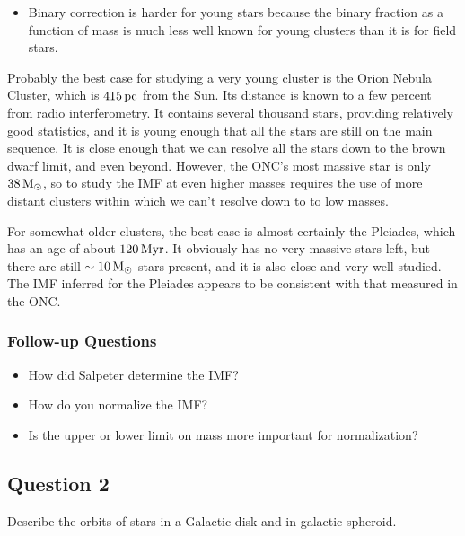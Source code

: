 \documentclass[a4paper,10pt]{article}
\begin{document}
\begin{itemize}
    \item Binary correction is harder for young stars because the binary fraction as a function of mass is much less well known for young clusters than it is for field stars.
\end{itemize}

{\noindent}Probably the best case for studying a very young cluster is the Orion Nebula Cluster, which is $415\,{\rm pc}$ from the Sun. Its distance is known to a few percent from radio interferometry. It contains several thousand stars, providing relatively good statistics, and it is young enough that all the stars are still on the main sequence. It is close enough that we can resolve all the stars down to the brown dwarf limit, and even beyond. However, the ONC's most massive star is only $38\,{\rm M_\odot}$, so to study the IMF at even higher masses requires the use of more distant clusters within which we can't resolve down to to low masses.

{\noindent}For somewhat older clusters, the best case is almost certainly the Pleiades, which has an age of about $120\,{\rm Myr}$. It obviously has no very massive stars left, but there are still $\sim10\,{\rm M_\odot}$ stars present, and it is also close and very well-studied. The IMF inferred for the Pleiades appears to be consistent with that measured in the ONC.

\subsubsection{Follow-up Questions}

\begin{itemize}
    \item How did Salpeter determine the IMF?
    \item How do you normalize the IMF?
    \item Is the upper or lower limit on mass more important for normalization?
\end{itemize}


\newpage
\subsection{Question 2}

Describe the orbits of stars in a Galactic disk and in galactic spheroid.
\end{document}
